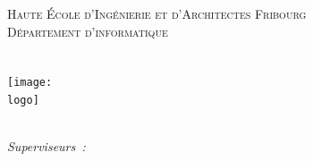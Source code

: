 \begin{center} %

\textsc{\large \textsc{Haute École d’Ingénierie et d’Architectes Fribourg}} \\ 
\textsc{Département d’informatique}  %
\\[3cm]
\textsc{\Large \majorheading} ~\\[0.5cm] %
{\large \minorheading} ~\\[1cm] %


\texttt{[image: \\logo]}
~\\[1cm]

{\Large \textbf{\authorname}}
~\\[1.3cm]

\begin{minipage}[t]{.9\textwidth} 
\begin{flushright} \large
\emph{Superviseurs~:}
\\[0.3cm]
\supervisors
\end{flushright}
\end{minipage}

\vfill
{\large \duedate} ~\\[1.3cm] %

\setcounter{page}{1}
\thispagestyle{empty}

\end{center}